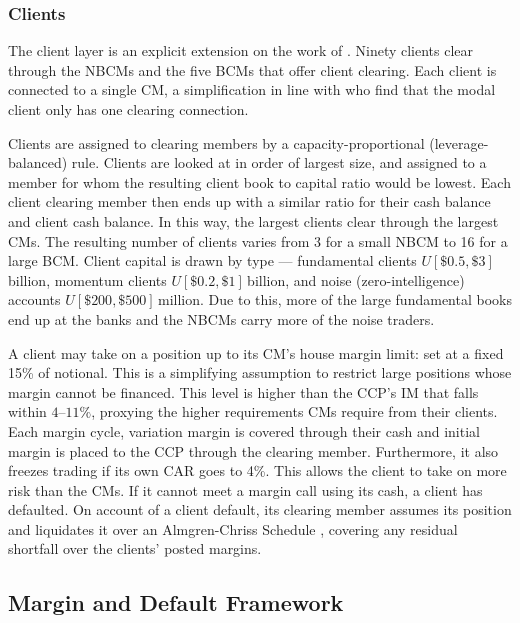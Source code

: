 \subsubsection{Clients}

The client layer is an explicit extension on the work of \cite{deloitte_ccp}. Ninety clients clear through the NBCMs and the five BCMs that offer client clearing. Each client is connected to a single CM, a simplification in line with \cite{ofr_2026} who find that the modal client only has one clearing connection.

Clients are assigned to clearing members by a capacity-proportional (leverage-balanced) rule. Clients are looked at in order of largest size, and assigned to a member for whom the resulting client book to capital ratio would be lowest. Each client clearing member then ends up with a similar ratio for their cash balance and client cash balance. In this way, the largest clients clear through the largest CMs. The resulting number of clients varies from 3 for a small NBCM to 16 for a large BCM.  Client capital is drawn by type --- fundamental clients
$U[\$0.5,\$3]$\,billion, momentum clients $U[\$0.2,\$1]$\,billion, and noise (zero-intelligence)
accounts $U[\$200,\$500]$\,million. Due to this, more of the large fundamental books end up at the banks and the NBCMs carry more of the noise traders. 

A client may take on a position up to its CM's house margin limit: set at a fixed 15\% of notional. This is a simplifying assumption to restrict large positions whose margin cannot be financed. This level is higher than the CCP's IM that falls within  $4$--$11\%$, proxying the higher requirements CMs require from their clients. Each margin cycle, variation margin is covered through their cash and initial margin is placed to the CCP through the clearing member. Furthermore, it also freezes trading if its own CAR goes to 4\%. This allows the client to take on more risk than the CMs. If it cannot meet a margin call using its cash, a client has defaulted. On account of a client default, its clearing member assumes its position and liquidates it over an Almgren-Chriss Schedule \citep{almgren_chriss_2000}, covering any residual shortfall over the clients' posted margins. 


\subsection{Margin and Default Framework}
\label{sec:clearing-margin}

